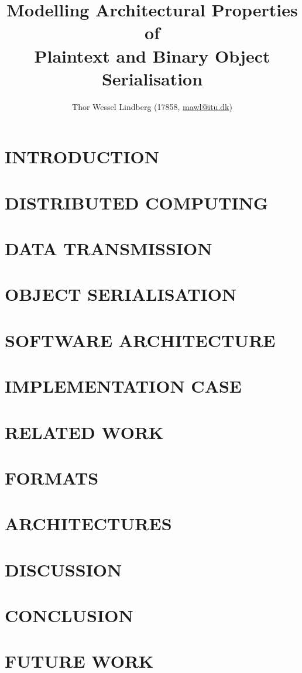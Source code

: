 \documentclass[10pt, twocolumn, letterpaper]{article}
\title{
    \vspace{-0.5cm}
    \huge \textbf{Modelling Architectural Properties of}  \\
    \huge \textbf{Plaintext and Binary Object Serialisation}  \\
}
\author{Thor Wessel Lindberg (17858, \href{mailto:mawl@itu.dk}{mawl@itu.dk})}
\date{}
\begin{document}
\maketitle



\section{INTRODUCTION}


\section{DISTRIBUTED COMPUTING} %


\section{DATA TRANSMISSION} %


\section{OBJECT SERIALISATION} %


\section{SOFTWARE ARCHITECTURE} %


\section{IMPLEMENTATION CASE} %


\section{RELATED WORK} %


\section{FORMATS} %


\section{ARCHITECTURES}
% 

\section{DISCUSSION}


\section{CONCLUSION}


\section{FUTURE WORK}



\end{document}
